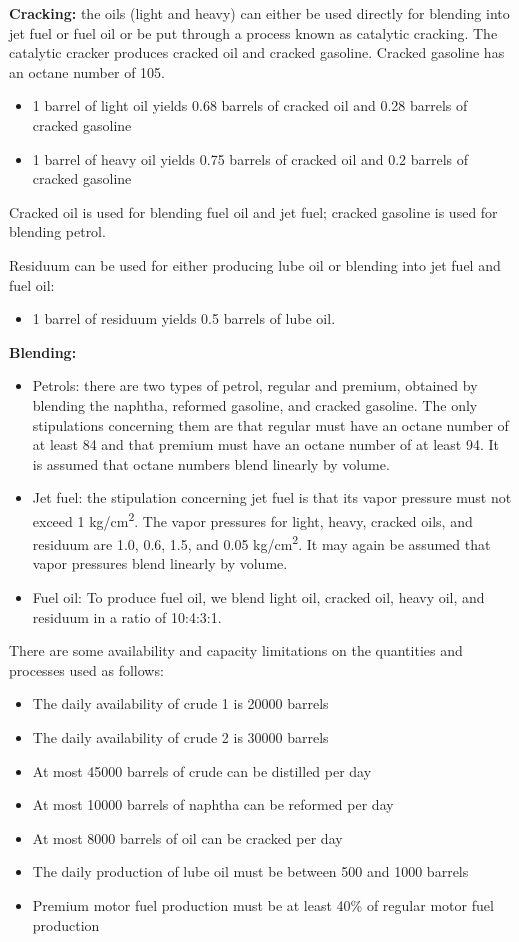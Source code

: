 \documentclass[11pt]{article}
\begin{document}
\textbf{Cracking:} the oils (light and heavy) can either be used directly for blending into jet fuel or fuel oil or be put through a process known as catalytic cracking. The catalytic cracker produces cracked oil and cracked gasoline. Cracked gasoline has an octane number of 105.

\begin{itemize}
    \item 1 barrel of light oil yields 0.68 barrels of cracked oil and 0.28 barrels of cracked gasoline
    \item 1 barrel of heavy oil yields 0.75 barrels of cracked oil and 0.2 barrels of cracked gasoline
\end{itemize}

Cracked oil is used for blending fuel oil and jet fuel; cracked gasoline is used for blending petrol.

Residuum can be used for either producing lube oil or blending into jet fuel and fuel oil:
\begin{itemize}
    \item 1 barrel of residuum yields 0.5 barrels of lube oil.
\end{itemize}

\textbf{Blending:}
\begin{itemize}
    \item Petrols: there are two types of petrol, regular and premium, obtained by blending the naphtha, reformed gasoline, and cracked gasoline. The only stipulations concerning them are that regular must have an octane number of at least 84 and that premium must have an octane number of at least 94. It is assumed that octane numbers blend linearly by volume.
    \item Jet fuel: the stipulation concerning jet fuel is that its vapor pressure must not exceed 1 kg/cm\textsuperscript{2}. The vapor pressures for light, heavy, cracked oils, and residuum are 1.0, 0.6, 1.5, and 0.05 kg/cm\textsuperscript{2}. It may again be assumed that vapor pressures blend linearly by volume.
    \item Fuel oil: To produce fuel oil, we blend light oil, cracked oil, heavy oil, and residuum in a ratio of 10:4:3:1.
\end{itemize}

There are some availability and capacity limitations on the quantities and processes used as follows:
\begin{itemize}
    \item The daily availability of crude 1 is 20000 barrels
    \item The daily availability of crude 2 is 30000 barrels
    \item At most 45000 barrels of crude can be distilled per day
    \item At most 10000 barrels of naphtha can be reformed per day
    \item At most 8000 barrels of oil can be cracked per day
    \item The daily production of lube oil must be between 500 and 1000 barrels
    \item Premium motor fuel production must be at least 40\% of regular motor fuel production
\end{itemize}
\end{document}
